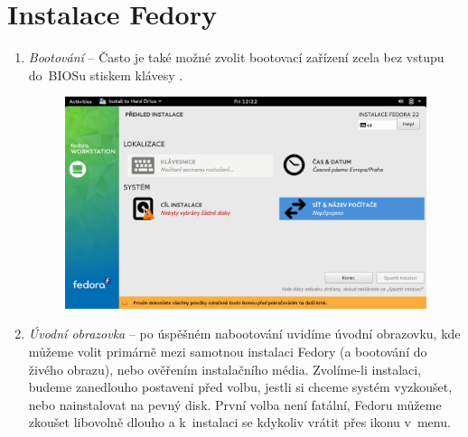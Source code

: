 \section*{Instalace Fedory}
\begin{enumerate}

\item\emph{Bootování} --  Často je také možné zvolit bootovací zařízení zcela bez vstupu do~BIOSu stiskem klávesy .

\begin{figure}[t]
\begin{center}
\includegraphics[width=\textwidth]{img/instalator-b}
 \label{fig:instalator-b}
\end{center}
\end{figure}

\item\emph{Úvodní obrazovka} -- po úspěšném nabootování uvidíme úvodní obrazovku, kde můžeme volit primárně mezi samotnou instalaci Fedory (a bootování do živého obrazu), nebo ověřením instalačního média. Zvolíme-li instalaci, budeme zanedlouho postaveni před volbu, jestli si chceme systém vyzkoušet, nebo nainstalovat na pevný disk. První volba není fatální, Fedoru můžeme zkoušet libovolně dlouho a k~instalaci se kdykoliv vrátit přes ikonu v~menu.


\end{enumerate}
